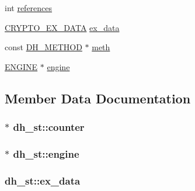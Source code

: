 \begin{DoxyCompactItemize}
int \hyperlink{structdh__st_a12e77dc7593509a21bf3362b97f472b7}{references}
\item 
\hyperlink{ossl__typ_8h_a7eaff1c18057495d8af18f22d1370b51}{C\+R\+Y\+P\+T\+O\+\_\+\+E\+X\+\_\+\+D\+A\+TA} \hyperlink{structdh__st_a82bd75ac9a0b1c3a698c28a87e56a78f}{ex\+\_\+data}
\item 
const \hyperlink{ossl__typ_8h_a5cc1db56c9b2f76075c0878f65e9b46d}{D\+H\+\_\+\+M\+E\+T\+H\+OD} $\ast$ \hyperlink{structdh__st_ae98dc2f23940781bceeb2b4cb931a2a3}{meth}
\item 
\hyperlink{ossl__typ_8h_abac45b251498719318e60ab8d6192510}{E\+N\+G\+I\+NE} $\ast$ \hyperlink{structdh__st_ab4369fbdcf15e3937755fd06420bd5b5}{engine}
\end{DoxyCompactItemize}


\subsection{Member Data Documentation}
\subsubsection[{\texorpdfstring{counter}{counter}}]{$\ast$ dh\+\_\+st\+::counter}\hypertarget{structdh__st_a68f2d92b8bc2abd3f0f1d31b061eaf07}{}\label{structdh__st_a68f2d92b8bc2abd3f0f1d31b061eaf07}
\subsubsection[{\texorpdfstring{engine}{engine}}]{$\ast$ dh\+\_\+st\+::engine}\hypertarget{structdh__st_ab4369fbdcf15e3937755fd06420bd5b5}{}\label{structdh__st_ab4369fbdcf15e3937755fd06420bd5b5}
\subsubsection[{\texorpdfstring{ex\+\_\+data}{ex_data}}]{ dh\+\_\+st\+::ex\+\_\+data}\hypertarget{structdh__st_a82bd75ac9a0b1c3a698c28a87e56a78f}{}\label{structdh__st_a82bd75ac9a0b1c3a698c28a87e56a78f}
